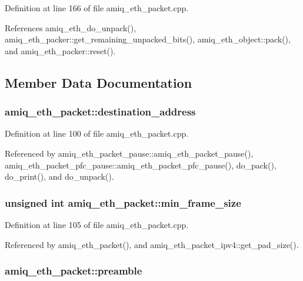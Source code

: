 Definition at line 166 of file amiq\_\-eth\_\-packet.cpp.

References amiq\_\-eth\_\-do\_\-unpack(), amiq\_\-eth\_\-packer::get\_\-remaining\_\-unpacked\_\-bits(), amiq\_\-eth\_\-object::pack(), and amiq\_\-eth\_\-packer::reset().

\subsection{Member Data Documentation}
\hypertarget{classamiq__eth__packet_a03a4cb1ee40c7aaa8db2c8a8560086ae}{
\subsubsection[{destination\_\-address}]{ {\bf amiq\_\-eth\_\-packet::destination\_\-address}}}
\label{classamiq__eth__packet_a03a4cb1ee40c7aaa8db2c8a8560086ae}


Definition at line 100 of file amiq\_\-eth\_\-packet.cpp.

Referenced by amiq\_\-eth\_\-packet\_\-pause::amiq\_\-eth\_\-packet\_\-pause(), amiq\_\-eth\_\-packet\_\-pfc\_\-pause::amiq\_\-eth\_\-packet\_\-pfc\_\-pause(), do\_\-pack(), do\_\-print(), and do\_\-unpack().\hypertarget{classamiq__eth__packet_a4e1eca2891cd445b62dbd17a98a5fc22}{
\subsubsection[{min\_\-frame\_\-size}]{\setlength{\rightskip}{0pt plus 5cm}unsigned int {\bf amiq\_\-eth\_\-packet::min\_\-frame\_\-size}}}
\label{classamiq__eth__packet_a4e1eca2891cd445b62dbd17a98a5fc22}


Definition at line 105 of file amiq\_\-eth\_\-packet.cpp.

Referenced by amiq\_\-eth\_\-packet(), and amiq\_\-eth\_\-packet\_\-ipv4::get\_\-pad\_\-size().\hypertarget{classamiq__eth__packet_a222c60f5498580313a81f07c58782d4c}{
\subsubsection[{preamble}]{ {\bf amiq\_\-eth\_\-packet::preamble}}}
\label{classamiq__eth__packet_a222c60f5498580313a81f07c58782d4c}


